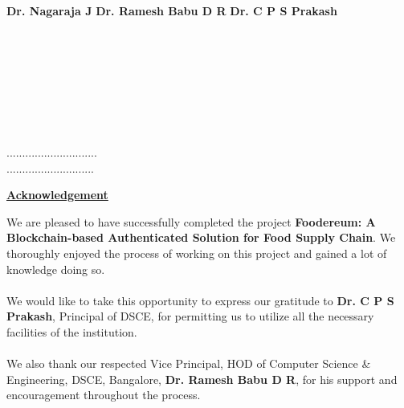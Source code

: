 \documentclass[12pt,a4paper,twocolumn,fleqn]{article}
\begin{document}
\\
\textbf{Dr. Nagaraja J}
\hfill
\hfill
\textbf{Dr. Ramesh Babu D R}
\hfill
\textbf{Dr. C P S Prakash} \\
\hfill 
{}
\hfill
{} \\
\hfill
{}
\hfill
{} \\
\\
\\
\hfill
{}
\hfill
{} \\
\\
\\
\hfill
{} \\
\hfill{.............................} \\
\hfill{............................} \\
\newpage
  \pagestyle{fancy}
  \fancyhf{}
  \thispagestyle{empty}
\begin{center} 
\LARGE{{\textbf{\underline{Acknowledgement}}}} \\
\end{center}
\normalsize
We are pleased to have successfully completed the project \textbf{Foodereum: A Blockchain-based Authenticated Solution for Food Supply Chain}. We thoroughly enjoyed the process of working on this project and gained a lot of knowledge doing so.
\\
\hfill
\\
We would like to take this opportunity to express our gratitude to \textbf{Dr. C P S Prakash}, Principal of DSCE, for permitting us to utilize all the necessary facilities of the institution.
\\
\hfill
\\
We also thank our respected Vice Principal, HOD of Computer Science \& Engineering, DSCE, Bangalore,\textbf{ Dr. Ramesh Babu D R}, for his support and encouragement throughout the process.
\end{document}
